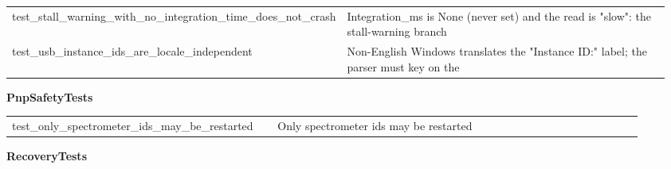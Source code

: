 \begin{longtable}{@{}>{\ttfamily\scriptsize\raggedright\arraybackslash}p{0.40\linewidth} >{\footnotesize\raggedright\arraybackslash}p{0.555\linewidth}@{}}
test\_\allowbreak{}stall\_\allowbreak{}warning\_\allowbreak{}with\_\allowbreak{}no\_\allowbreak{}integration\_\allowbreak{}time\_\allowbreak{}does\_\allowbreak{}not\_\allowbreak{}crash & Integration\_ms is None (never set) and the read is "slow": the stall-warning branch \\
test\_\allowbreak{}usb\_\allowbreak{}instance\_\allowbreak{}ids\_\allowbreak{}are\_\allowbreak{}locale\_\allowbreak{}independent & Non-English Windows translates the "Instance ID:" label; the parser must key on the \\
\end{longtable}
\par\smallskip \textbf{PnpSafetyTests}\par\nopagebreak\smallskip
\begin{longtable}{@{}>{\ttfamily\scriptsize\raggedright\arraybackslash}p{0.40\linewidth} >{\footnotesize\raggedright\arraybackslash}p{0.555\linewidth}@{}}
test\_\allowbreak{}only\_\allowbreak{}spectrometer\_\allowbreak{}ids\_\allowbreak{}may\_\allowbreak{}be\_\allowbreak{}restarted & Only spectrometer ids may be restarted \\
\end{longtable}
\par\smallskip \textbf{RecoveryTests}\par\nopagebreak\smallskip
